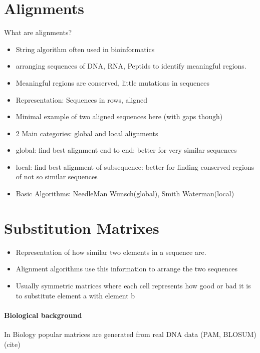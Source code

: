 \section{Alignments}
What are alignments? 
\begin{itemize}
	\item String algorithm often used in bioinformatics 
	\item arranging sequences of DNA, RNA, Peptids to identify meaningful regions.
	\item Meaningful regions are conserved, little mutations in sequences
	\item Representation: Sequences in rows, aligned 
	\item Minimal example of two aligned sequences here (with gaps though)
	\item 2 Main categories: global and local alignments 
	\item global: find best alignment end to end: better for very similar sequences
	\item local: find best alignment of subsequence: better for finding conserved regions of not so similar sequences
	\item Basic Algorithms: NeedleMan Wunsch(global), Smith Waterman(local) 
\end{itemize} 


\section{Substitution Matrixes}
\label{sec:foundationsubstitutionmatrix}
	\begin{itemize}
		\item Representation of how similar two elements in a sequence are. 
		\item Alignment algorithms use this information to arrange the two sequences 
		\item Usually symmetric matrices where each cell represents how good or bad it is to substitute element a with element b  
	\end{itemize}
	\paragraph{Biological background}
	In Biology popular matrices are generated from real DNA data (PAM, BLOSUM) (cite)


